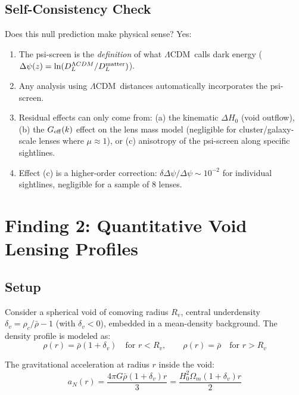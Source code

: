 \documentclass[11pt,a4paper]{article}
\newcommand{\LCDM}{$\Lambda$CDM}
\newcommand{\Geff}{G_{\rm eff}}
\newcommand{\Dpsi}{\Delta\psi}
\begin{document}
\subsection{Self-Consistency Check}

Does this null prediction make physical sense?  Yes:
\begin{enumerate}
\item The psi-screen is the \emph{definition} of what \LCDM\ calls
  dark energy ($\Dpsi(z) = \ln(D_L^{\Lambda CDM}/D_L^{\rm matter})$).
\item Any analysis using \LCDM\ distances automatically incorporates
  the psi-screen.
\item Residual effects can only come from: (a) the kinematic $\Delta H_0$
  (void outflow), (b) the $\Geff(k)$ effect on the lens mass model
  (negligible for cluster/galaxy-scale lenses where $\mu \approx 1$),
  or (c) anisotropy of the psi-screen along specific sightlines.
\item Effect (c) is a higher-order correction: $\delta\Dpsi/\Dpsi \sim 10^{-2}$
  for individual sightlines, negligible for a sample of 8 lenses.
\end{enumerate}


\section{Finding 2: Quantitative Void Lensing Profiles}
\label{sec:void-profiles}

\subsection{Setup}

Consider a spherical void of comoving radius $R_v$, central underdensity
$\delta_v = \rho_c/\bar{\rho} - 1$ (with $\delta_v < 0$), embedded in
a mean-density background.  The density profile is modeled as:
\begin{equation}
\rho(r) = \bar{\rho}(1 + \delta_v) \quad \text{for } r < R_v,
\qquad \rho(r) = \bar{\rho} \quad \text{for } r > R_v
\label{eq:void-density}
\end{equation}

The gravitational acceleration at radius $r$ inside the void:
\begin{equation}
a_N(r) = \frac{4\pi G \bar{\rho}(1+\delta_v) r}{3}
= \frac{H_0^2 \Omega_m (1+\delta_v) r}{2}
\label{eq:void-accel}
\end{equation}
\end{document}
